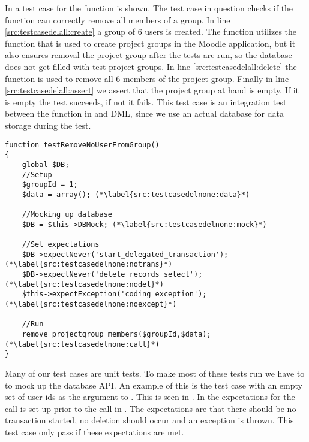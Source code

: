In  a test case for the function  is shown.
The test case in question checks if the function can correctly remove all members of a group. 
In line \ref{src:testcasedelall:create} a group of $6$ users is created.
The function  utilizes the function that is used to create project groups in the Moodle application, but it also ensures removal the project group after the tests are run, so the database does not get filled with test project groups.
In line \ref{src:testcasedelall:delete} the function  is used to remove all $6$ members of the project group.
Finally in line \ref{src:testcasedelall:assert} we assert that the project group at hand is empty.
If it is empty the test succeeds, if not it fails.
This test case is an integration test between the function  in \admlib{} and \moodle{} DML, since we use an actual database for data storage during the test.


\begin{lstlisting}[style=phpCode, caption=\myCaption{A test case for the function \fu{remove\_projectgroup\_members}. The test case tests if the function correctly handles the erronous input of an empty set of users}, label=src:testcasedelnone]
function testRemoveNoUserFromGroup()
{
	global $DB;
	//Setup
	$groupId = 1;
	$data = array(); (*\label{src:testcasedelnone:data}*)
	
	//Mocking up database
	$DB = $this->DBMock; (*\label{src:testcasedelnone:mock}*)
	
	//Set expectations
	$DB->expectNever('start_delegated_transaction'); (*\label{src:testcasedelnone:notrans}*)
	$DB->expectNever('delete_records_select'); (*\label{src:testcasedelnone:nodel}*)
	$this->expectException('coding_exception'); (*\label{src:testcasedelnone:noexcept}*)
	
	//Run
	remove_projectgroup_members($groupId,$data); (*\label{src:testcasedelnone:call}*)
}
\end{lstlisting}
Many of our test cases are unit tests.
To make most of these tests run we have to to mock up the database API.
An example of this is the test case with an empty set of user ids as the argument \varuserids{} to .
This is seen in .
In  the expectations for the call is set up prior to the call in .
The expectations are that there should be no transaction started, no deletion should occur and an exception is thrown.
This test case only pass if these expectations are met.








